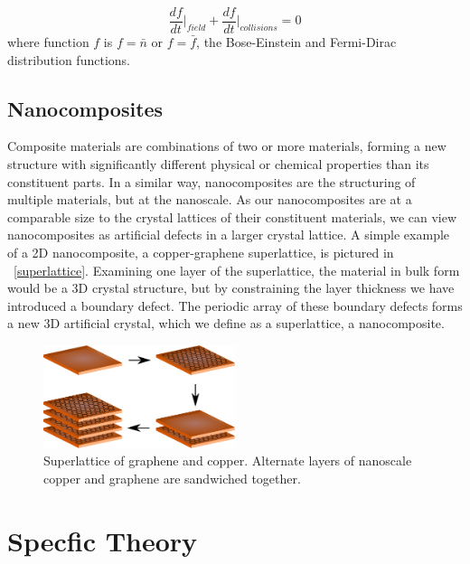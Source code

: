 \documentclass[12pt,titlepage,draft]{article}
\newcommand{\figref}[2][\figurename~]{#1\ref{#2}}
\begin{document}
\begin{equation}
\label{boltz-specific}
	\frac{df}{dt}\bigg|_{field} + \frac{df}{dt}\bigg|_{collisions} = 0
\end{equation}
where function $f$ is $f = \bar{n}$ or $f = \bar{f}$, the Bose-Einstein
and Fermi-Dirac distribution functions.

\subsection{Nanocomposites}

Composite materials are combinations of two or more materials, forming a new structure with significantly different physical or chemical properties than its constituent parts. In a similar way, nanocomposites are the structuring of multiple materials, but at the nanoscale. As our nanocomposites are at a comparable size to the crystal lattices of their constituent materials, we can view
nanocomposites as artificial defects in a larger crystal lattice. A
simple example of a 2D nanocomposite, a copper-graphene superlattice,
is pictured in \figref{superlattice}. Examining one layer of the
superlattice, the material in bulk form would be a 3D crystal structure,
but by constraining the layer thickness we have introduced a boundary
defect. The periodic array of these boundary defects forms a new 3D
artificial crystal, which we define as a superlattice, a nanocomposite.

\begin{figure}
	\centering
	\includegraphics[width=0.5\textwidth]{graphene-superlattice.eps}
	\caption{Superlattice of graphene and copper. Alternate layers of
	nanoscale copper and graphene are sandwiched together.}
\end{figure}

\section{Specfic Theory}
\end{document}
